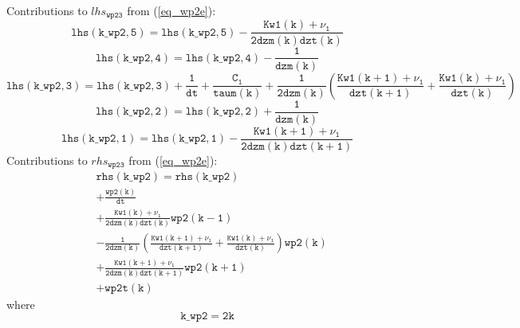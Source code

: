 \documentclass[11pt,fleqn]{article}
\begin{document}
Contributions to $lhs_{\mathtt{wp23}}$ from (\ref{eq_wp2e}):
%
\begin{equation}
\mathtt{ lhs(k\_wp2,5) = lhs(k\_wp2,5) -\frac{Kw1(k)+\nu_1}{2 dzm(k)dzt(k)} }
\end{equation}
%
\begin{equation}
\mathtt{ lhs(k\_wp2,4) = lhs(k\_wp2,4) - \frac{1}{dzm(k)} }
\end{equation}
%
\begin{equation}
\mathtt{ 
 lhs(k\_wp2,3) 
 = lhs(k\_wp2,3) 
 +\frac{1}{dt}
 +\frac{C_1}{taum(k)}
 +\frac{1}{2 dzm(k)} \left(  \frac{Kw1(k+1)+\nu_1}{dzt(k+1)}
                           + \frac{Kw1(k)+\nu_1}{dzt(k)} \right) }
\end{equation}
%
\begin{equation}
\mathtt{ lhs(k\_wp2,2) = lhs(k\_wp2,2) + \frac{1}{dzm(k)} }
\end{equation}
%
\begin{equation}
\mathtt{ lhs(k\_wp2,1) = lhs(k\_wp2,1) -\frac{Kw1(k+1)+\nu_1}{2 dzm(k)dzt(k+1)} }
\end{equation}
%
Contributions to $rhs_{\mathtt{wp23}}$ from (\ref{eq_wp2e}):
%
\begin{equation}
\begin{split}
& \mathtt{ rhs(k\_wp2) = rhs(k\_wp2) } \\
& \mathtt{
  +\frac{wp2(k)}{dt}
  } \\
& \mathtt{
  +\frac{Kw1(k)+\nu_1}{2 dzm(k)dzt(k)} wp2(k-1)
  } \\
& \mathtt{
  -\frac{1}{2 dzm(k)} \left(  \frac{Kw1(k+1)+\nu_1}{dzt(k+1)}
                            + \frac{Kw1(k)+\nu_1}{dzt(k)} \right) wp2(k)
  } \\
& \mathtt{
  +\frac{Kw1(k+1)+\nu_1}{2 dzm(k)dzt(k+1)} wp2(k+1)
  } \\
& \mathtt{
  + wp2t(k)
 }
\end{split}
\end{equation}
%
where
%
\begin{equation}
\mathtt{ k\_wp2 = 2 k}
\end{equation}
\end{document}
